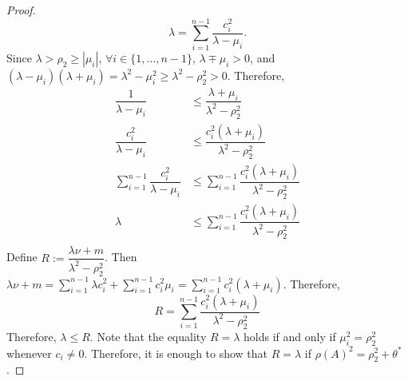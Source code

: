 \documentclass[12pt]{article}
\theoremstyle{plain}
\numberwithin{equation}{section}
\begin{document}
\begin{proof}
		\begin{equation}\label{eq:secular2}
			\lambda=\sum \limits_{i=1}^{n-1}\frac{c_i^2}{\lambda-\mu_i}.
		\end{equation}
		Since $\lambda>\rho_2\ge|\mu_i|$, $\forall i \in \{1,\dots,n-1\}$,
		$\lambda\mp\mu_i>0$, and $(\lambda-\mu_i)(\lambda+\mu_i)=\lambda^2-\mu_i^2\ge\lambda^2-\rho_2^2>0$. Therefore,\\
		\begin{align*}
			\dfrac{1}{\lambda-\mu_i}&\leq \dfrac{\lambda+\mu_i}{\lambda^2-\rho_2^2}\\
			\dfrac{c_i^2}{\lambda-\mu_i}&\leq \dfrac{c_i^2(\lambda+\mu_i)}{\lambda^2-\rho_2^2}\\
			\sum \limits_{i=1}^{n-1}\dfrac{c_i^2}{\lambda-\mu_i}&\leq \sum \limits_{i=1}^{n-1}\dfrac{c_i^2(\lambda+\mu_i)}{\lambda^2-\rho_2^2}\\
			\lambda &\leq \sum \limits_{i=1}^{n-1}\dfrac{c_i^2(\lambda+\mu_i)}{\lambda^2-\rho_2^2}\\
		\end{align*}
		Define $R:= \dfrac{\lambda \nu+m}{\lambda^2-\rho_2^2}$. Then \\
		$\lambda \nu+m=\sum \limits_{i=1}^{n-1}\lambda c_i^2+\sum \limits_{i=1}^{n-1}c_i^2 \mu_i=\sum \limits_{i=1}^{n-1}c_i^2(\lambda+\mu_i)$. Therefore, $$R= \sum \limits_{i=1}^{n-1}\dfrac{c_i^2(\lambda+\mu_i)}{\lambda^2-\rho_2^2}$$
		Therefore, $\lambda \leq R$. Note that the equality $R =\lambda$ holds if and only if  $\mu_i^2=\rho_2^2$ whenever $c_i \neq 0$. Therefore, it is enough to show that $R= \lambda$ if $\rho(A)^2=\rho_2^2+\theta^*$.
		
		
		

\end{proof}
\end{document}
